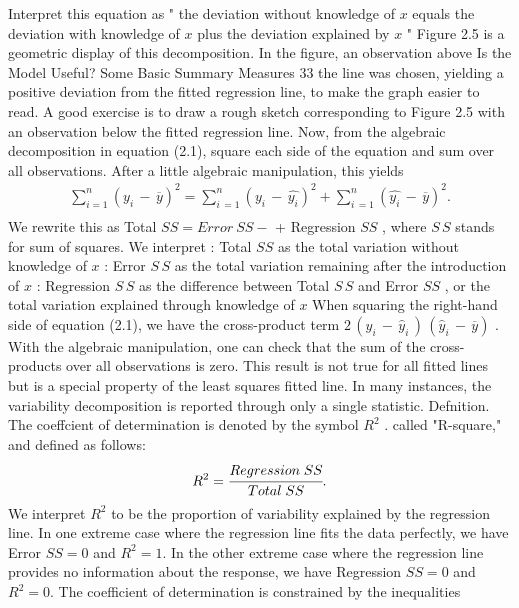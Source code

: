 \documentclass[11pt]{article}
\begin{document}
Interpret this equation as " the deviation without knowledge of \(x\) equals the
deviation with knowledge of \(x\) plus the deviation explained by \(x\) " Figure 2.5 is
 a geometric display of this decomposition. In the figure, an observation above
 Is the Model Useful? Some Basic Summary Measures 33
 the line was chosen, yielding a positive deviation from the fitted regression line,
 to make the graph easier to read. \(\mathrm{A}\) good exercise is to draw a rough sketch
 corresponding to Figure 2.5 with an observation below the fitted regression line.
Now, from the algebraic decomposition in equation (2.1), square each side of
 the equation and sum over all observations. After a little algebraic manipulation,
this yields
\[
\begin{aligned} {\sum_{i=1}^{n} \left( y_{i} \,-\, \overline{{y}} \right)^{2}=\sum_{i \,=1}^{n} \left( y_{i} \,-\, \widehat{y_{i}} \right)^{2}+\sum_{i \,=1}^{n} \left( \widehat{y_{i}} \,-\, \overline{{y}} \right)^{2} .} \\ \end{aligned} \tag{2.2}
\]
We rewrite this as Total \(S S=E r r o r ~ S S-\) + Regression \(\mathit{S S}\) , where \(S \, S\) stands for
sum of squares. We interpret
: Total \(\mathit{S S}\) as the total variation without knowledge of \(x\)
: Error \(S \, S\) as the total variation remaining after the introduction of \(x\)
: Regression \(S \, S\) as the difference between Total \(S \, S\) and Error \(\mathit{S S}\) , or the total
variation explained through knowledge of \(x\)
When squaring the right-hand side of equation (2.1), we have the cross-product
term \(2 \, ( y_{i} \,-\, \widehat{y}_{i} \, ) \, ( \widehat{y}_{i} \,-\, \overline{{y}} )\) . With the algebraic manipulation, one can check that the
sum of the cross-products over all observations is zero. This result is not true for
 all fitted lines but is a special property of the least squares fitted line.
In many instances, the variability decomposition is reported through only a
 single statistic.
Defnition. The coeffcient of determination is denoted by the symbol \(R^{2}\) .
called "R-square," and defined as follows:
\[
R^{2}=\cfrac{R e g r e s s i o n \; S S} {T o t a l \; S S} .
\]
We interpret \(R^{2}\) to be the proportion of variability explained by the regression
line. In one extreme case where the regression line fits the data perfectly, we
 have Error \(S S=0\) and \(R^{2}=1 .\) In the other extreme case where the regression
line provides no information about the response, we have Regression \(S S=0\)
and \(R^{2}=0 .\) The coefficient of determination is constrained by the inequalities
\end{document}
